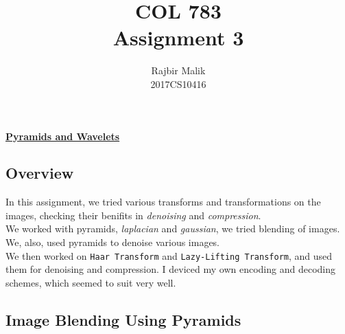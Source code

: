\documentclass{article}
\title{COL 783 \\ Assignment 3}
\author{Rajbir Malik \\ 2017CS10416}
\begin{document}
    
    \maketitle

    \begin{center}
    \Large{\underline{\textbf{Pyramids and Wavelets}}}
    \end{center}
    \subsection*{Overview}
    In this assignment, we tried various transforms and transformations on the images, checking their benifits in \textit{denoising} and \textit{compression}.\\ 
    We worked with pyramids, \textit{laplacian} and \textit{gaussian}, we tried blending of images. We, also, used pyramids to denoise various images.\\
    We then worked on \texttt{Haar Transform} and \texttt{Lazy-Lifting Transform}, and used them for denoising and compression. I deviced my own encoding and decoding schemes, which seemed to suit very well.\\
    \pagebreak
    \subsection*{Image Blending Using Pyramids}
\end{document}
